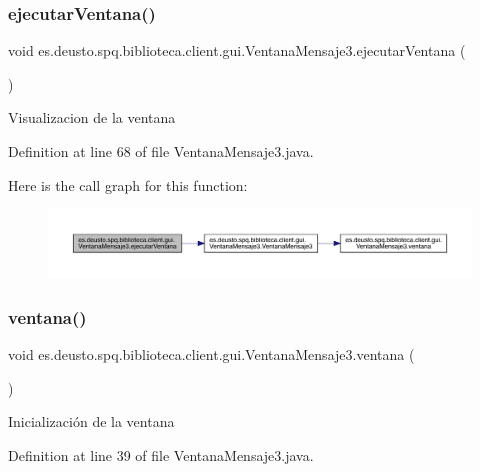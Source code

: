 \subsubsection{\texorpdfstring{ejecutar\+Ventana()}{ejecutarVentana()}}
{\footnotesize\ttfamily void es.\+deusto.\+spq.\+biblioteca.\+client.\+gui.\+Ventana\+Mensaje3.\+ejecutar\+Ventana (\begin{DoxyParamCaption}{ }\end{DoxyParamCaption})}

Visualizacion de la ventana 

Definition at line 68 of file Ventana\+Mensaje3.\+java.

Here is the call graph for this function\+:
\nopagebreak
\begin{figure}[H]
\begin{center}
\leavevmode
\includegraphics[width=350pt]{classes_1_1deusto_1_1spq_1_1biblioteca_1_1client_1_1gui_1_1_ventana_mensaje3_ae5d8b8c6e4b454d53bae4af558a869e0_cgraph}
\end{center}
\end{figure}
\mbox{\label{classes_1_1deusto_1_1spq_1_1biblioteca_1_1client_1_1gui_1_1_ventana_mensaje3_a9e0e23158e6fcc44783491bf9d48e98d}} 
\subsubsection{\texorpdfstring{ventana()}{ventana()}}
{\footnotesize\ttfamily void es.\+deusto.\+spq.\+biblioteca.\+client.\+gui.\+Ventana\+Mensaje3.\+ventana (\begin{DoxyParamCaption}{ }\end{DoxyParamCaption})}

Inicialización de la ventana 

Definition at line 39 of file Ventana\+Mensaje3.\+java.

